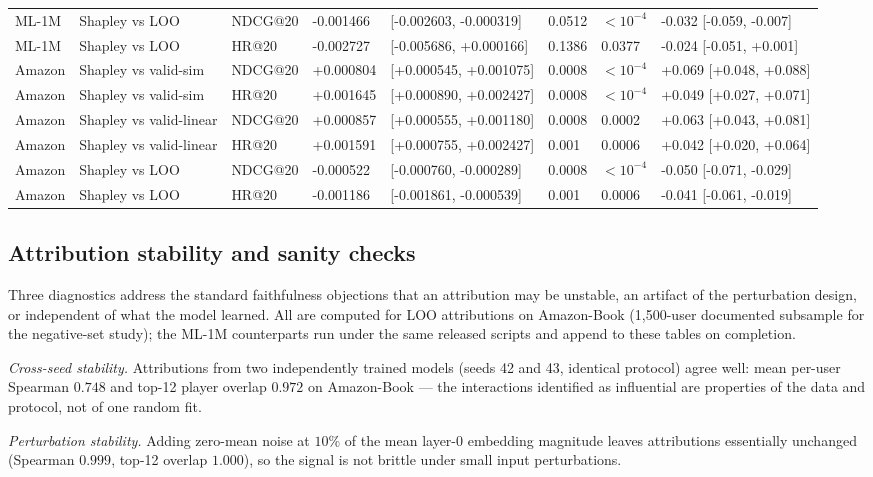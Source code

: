 \documentclass[pdflatex,sn-mathphys-num]{sn-jnl}
\begin{document}
\begin{table}[t]
{\begin{tabular}{llllllll}
ML-1M & Shapley vs LOO & NDCG@20 & -0.001466 & [-0.002603, -0.000319] & 0.0512 & $<10^{-4}$ & -0.032 [-0.059, -0.007] \\
ML-1M & Shapley vs LOO & HR@20 & -0.002727 & [-0.005686, +0.000166] & 0.1386 & 0.0377 & -0.024 [-0.051, +0.001] \\
Amazon & Shapley vs valid-sim & NDCG@20 & +0.000804 & [+0.000545, +0.001075] & 0.0008 & $<10^{-4}$ & +0.069 [+0.048, +0.088] \\
Amazon & Shapley vs valid-sim & HR@20 & +0.001645 & [+0.000890, +0.002427] & 0.0008 & $<10^{-4}$ & +0.049 [+0.027, +0.071] \\
Amazon & Shapley vs valid-linear & NDCG@20 & +0.000857 & [+0.000555, +0.001180] & 0.0008 & 0.0002 & +0.063 [+0.043, +0.081] \\
Amazon & Shapley vs valid-linear & HR@20 & +0.001591 & [+0.000755, +0.002427] & 0.001 & 0.0006 & +0.042 [+0.020, +0.064] \\
Amazon & Shapley vs LOO & NDCG@20 & -0.000522 & [-0.000760, -0.000289] & 0.0008 & $<10^{-4}$ & -0.050 [-0.071, -0.029] \\
Amazon & Shapley vs LOO & HR@20 & -0.001186 & [-0.001861, -0.000539] & 0.001 & 0.0006 & -0.041 [-0.061, -0.019] \\
\bottomrule
\end{tabular}
}
\end{table}

\subsection{Attribution stability and sanity checks}\label{subsec:stability_sanity}

Three diagnostics address the standard faithfulness objections that an attribution may be unstable, an artifact of the perturbation design, or independent of what the model learned. All are computed for LOO attributions on Amazon-Book (1,500-user documented subsample for the negative-set study); the ML-1M counterparts run under the same released scripts and append to these tables on completion.

\emph{Cross-seed stability.} Attributions from two independently trained models (seeds 42 and 43, identical protocol) agree well: mean per-user Spearman $0.748$ and top-12 player overlap $0.972$ on Amazon-Book --- the interactions identified as influential are properties of the data and protocol, not of one random fit.

\emph{Perturbation stability.} Adding zero-mean noise at $10\%$ of the mean layer-0 embedding magnitude leaves attributions essentially unchanged (Spearman $0.999$, top-12 overlap $1.000$), so the signal is not brittle under small input perturbations.
\end{document}
